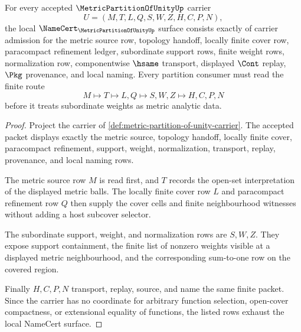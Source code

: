 \begin{theorem}
\label{thm:metric-partition-of-unity-namecert-obligations}
For every accepted $\MetricPartitionOfUnityUp$ carrier
$$
U=(M,T,L,Q,S,W,Z,H,C,P,N),
$$
the local $\NameCert_{\MetricPartitionOfUnityUp}$ surface consists exactly of carrier admission for the metric source row, topology handoff, locally finite cover row, paracompact refinement ledger, subordinate support rows, finite weight rows, normalization row, componentwise $\hsame$ transport, displayed $\Cont$ replay, $\Pkg$ provenance, and local naming. Every partition consumer must read the finite route
$$
M \longmapsto T \longmapsto L,Q \longmapsto S,W,Z \longmapsto H,C,P,N
$$
before it treats subordinate weights as metric analytic data.
\end{theorem}
\begin{proof}
Project the carrier of \autoref{def:metric-partition-of-unity-carrier}. The accepted packet displays exactly the metric source, topology handoff, locally finite cover, paracompact refinement, support, weight, normalization, transport, replay, provenance, and local naming rows.

The metric source row $M$ is read first, and $T$ records the open-set interpretation of the displayed metric balls. The locally finite cover row $L$ and paracompact refinement row $Q$ then supply the cover cells and finite neighbourhood witnesses without adding a host subcover selector.

The subordinate support, weight, and normalization rows are $S,W,Z$. They expose support containment, the finite list of nonzero weights visible at a displayed metric neighbourhood, and the corresponding sum-to-one row on the covered region.

Finally $H,C,P,N$ transport, replay, source, and name the same finite packet. Since the carrier has no coordinate for arbitrary function selection, open-cover compactness, or extensional equality of functions, the listed rows exhaust the local NameCert surface.
\end{proof}

